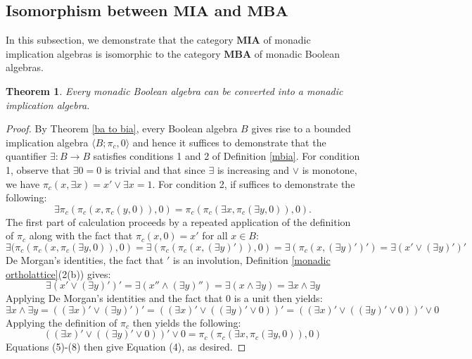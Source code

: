 \documentclass[reqno]{amsart}
\theoremstyle{plain}
\newtheorem{theorem}{Theorem}[section]
\theoremstyle{definition}
\begin{document}
\subsection{Isomorphism between $\mathbf{MIA}$ and $\mathbf{MBA}$} In this subsection, we demonstrate that the category $\mathbf{MIA}$ of monadic implication algebras is isomorphic to the category $\mathbf{MBA}$ of monadic Boolean algebras. 

\begin{theorem}\label{mba to mia}
    Every monadic Boolean algebra can be converted into a monadic implication algebra. 
\end{theorem}
\begin{proof}
    By Theorem \ref{ba to bia}, every Boolean algebra $B$ gives rise to a bounded implication algebra $\langle B;\pi_c,0\rangle$ and hence it suffices to demonstrate that the quantifier $\exists\colon B\to B$ satisfies conditions 1 and 2 of Definition \ref{mbia}. For condition 1, observe that $\exists 0=0$ is trivial and that since $\exists$ is increasing and $\vee$ is monotone, we have $\pi_c(x,\exists x)=x'\vee\exists x=1$. For condition 2, if suffices to demonstrate the following: 
    \begin{equation}
\exists\pi_c(\pi_c(x,\pi_c(y,0)),0)=\pi_c(\pi_c(\exists x,\pi_c(\exists y,0)),0).
    \end{equation}
    The first part of calculation proceeds by a repeated application of the definition of $\pi_c$ along with the fact that $\pi_c(x,0)=x'$ for all $x\in B$:
    \begin{equation}
        \exists(\pi_c(\pi_c(x,\pi_c(\exists y,0)),0)=\exists(\pi_c(\pi_c(x,(\exists y)')),0)=\exists(\pi_c(x,(\exists y)')')=\exists(x'\vee(\exists y)')'
    \end{equation}
    De Morgan's identities, the fact that $'$ is an involution, Definition \ref{monadic ortholattice}(2(b)) gives:
    \begin{equation}
        \exists(x'\vee(\exists y)')'=\exists(x''\wedge(\exists y)'')=\exists(x\wedge\exists y)=\exists x\wedge \exists y
    \end{equation}
Applying De Morgan's identities and the fact that $0$ is a unit then yields: 
\begin{equation}
     \exists x\wedge \exists y=((\exists x)'\vee (\exists y)')'=((\exists x)'\vee((\exists y)'\vee 0))'=((\exists x)'\vee((\exists y)'\vee 0))'\vee 0
\end{equation}
Applying the definition of $\pi_c$ then yields the following: 
\begin{equation}
    ((\exists x)'\vee((\exists y)'\vee 0))'\vee 0=\pi_c(\pi_c(\exists x,\pi_c(\exists y,0)),0)
\end{equation}
Equations (5)-(8) then give Equation (4), as desired.    
\end{proof}
\end{document}
